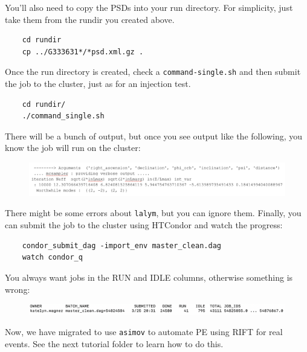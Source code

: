 \documentclass{article}
\begin{document}
You'll also need to copy the PSDs into your run directory. For simplicity, just take them from the rundir you created above.

\begin{verbatim}
    cd rundir
    cp ../G333631*/*psd.xml.gz .
\end{verbatim}

Once the run directory is created, check a \texttt{command-single.sh} and then submit the job to the cluster, just as for an injection test.

\begin{verbatim}
    cd rundir/
    ./command_single.sh
\end{verbatim}
\newpage
There will be a bunch of output, but once you see output like the following, you know the job will run on the cluster:
\begin{figure}[h!]
    \centering
    \includegraphics[width=0.9\linewidth]{output.png}
    \label{fig:output}
\end{figure}
There might be some errors about \texttt{lalym}, but you can ignore them. Finally, you can submit the job to the cluster using HTCondor and watch the progress:
\begin{verbatim}
    condor_submit_dag -import_env master_clean.dag
    watch condor_q
\end{verbatim}
You always want jobs in the RUN and IDLE columns, otherwise something is wrong:
\begin{figure}[h!]
    \centering
    \includegraphics[width=0.75\linewidth]{condor.png}
    \label{fig:condor}
\end{figure}

Now, we have migrated to use \texttt{asimov} to automate PE using RIFT for real events. See the next tutorial folder to learn how to do this.
\end{document}
